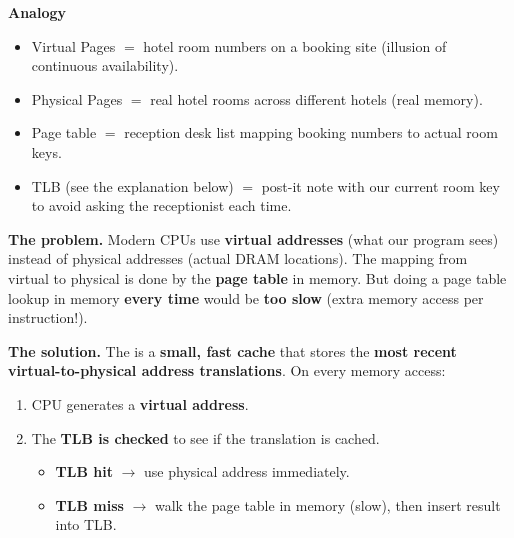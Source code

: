 \begin{remarkbox}
    \highspace
    \begin{flushleft}
        \textcolor{Green3}{ \textbf{Analogy}}
    \end{flushleft}
    \begin{itemize}
        \item Virtual Pages $=$ hotel room numbers on a booking site (illusion of continuous availability).
        \item Physical Pages $=$ real hotel rooms across different hotels (real memory).
        \item Page table $=$ reception desk list mapping booking numbers to actual room keys.
        \item TLB (see the explanation below) $=$ post-it note with our current room key to avoid asking the receptionist each time.
    \end{itemize}
\end{remarkbox}

\highspace
\textcolor{Red2}{ \textbf{The problem.}} Modern CPUs use \textbf{virtual addresses} (what our program sees) instead of physical addresses (actual DRAM locations). The mapping from virtual to physical is done by the \textbf{page table} in memory. But doing a page table lookup in memory \textbf{every time} would be \textbf{too slow} (extra memory access per instruction!).

\highspace
\textcolor{Green3}{ \textbf{The solution.}} The  is a \textbf{small, fast cache} that stores the \textbf{most recent virtual-to-physical address translations}. On every memory access:
\begin{enumerate}
    \item CPU generates a \textbf{virtual address}.
    \item The \textbf{TLB is checked} to see if the translation is cached.
    \begin{itemize}
        \item[\textcolor{Green3}{\faIcon{check}}] \textbf{TLB hit} $\rightarrow$ use physical address immediately.
        \item[\textcolor{Red2}{\faIcon{times}}] \textbf{TLB miss} $\rightarrow$ walk the page table in memory (slow), then insert result into TLB.
    \end{itemize}
\end{enumerate}

\newpage

